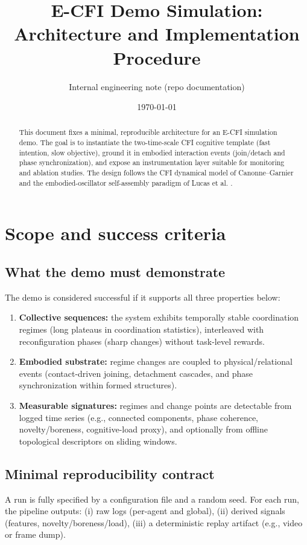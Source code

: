 \documentclass[11pt]{article}
\title{E-CFI Demo Simulation: Architecture and Implementation Procedure}
\author{Internal engineering note (repo documentation)}
\date{\today}
\begin{document}
\maketitle

\begin{abstract}
This document fixes a minimal, reproducible architecture for an E-CFI simulation demo.
The goal is to instantiate the two-time-scale CFI cognitive template (fast intention, slow objective),
ground it in embodied interaction events (join/detach and phase synchronization),
and expose an instrumentation layer suitable for monitoring and ablation studies.
The design follows the CFI dynamical model of Canonne--Garnier and the embodied-oscillator self-assembly paradigm of Lucas et al.
\cite{canonne_garnier_mcm2011,lucas_acsos2024_embodied}.
\end{abstract}

\section{Scope and success criteria}
\subsection{What the demo must demonstrate}
The demo is considered successful if it supports all three properties below:

\begin{enumerate}[label=(S\arabic*),leftmargin=2.2em]
\item \textbf{Collective sequences:} the system exhibits temporally stable coordination regimes (long plateaus in coordination statistics),
interleaved with reconfiguration phases (sharp changes) without task-level rewards.
\item \textbf{Embodied substrate:} regime changes are coupled to physical/relational events
(contact-driven joining, detachment cascades, and phase synchronization within formed structures).
\item \textbf{Measurable signatures:} regimes and change points are detectable from logged time series
(e.g., connected components, phase coherence, novelty/boreness, cognitive-load proxy),
and optionally from offline topological descriptors on sliding windows.
\end{enumerate}

\subsection{Minimal reproducibility contract}
A run is fully specified by a configuration file and a random seed.
For each run, the pipeline outputs:
(i) raw logs (per-agent and global),
(ii) derived signals (features, novelty/boreness/load),
(iii) a deterministic replay artifact (e.g., video or frame dump).
\end{document}
